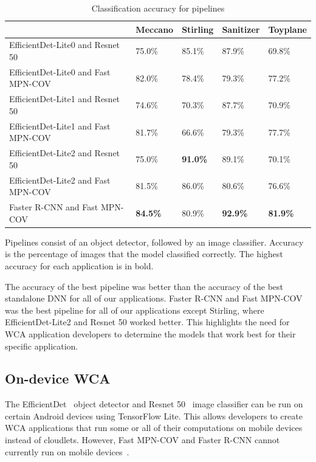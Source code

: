 \begin{table}
\begin{tabular}{|l||l|l|l|l|}
  \hline
  & Meccano & Stirling & Sanitizer & Toyplane\\
  \hline
  \hline
  EfficientDet-Lite0 and Resnet 50 & 75.0\% & 85.1\% & 87.9\% & 69.8\%\\
  EfficientDet-Lite0 and Fast MPN-COV & 82.0\% & 78.4\% & 79.3\% & 77.2\%\\
  EfficientDet-Lite1 and Resnet 50 & 74.6\% & 70.3\% & 87.7\% & 70.9\%\\
  EfficientDet-Lite1 and Fast MPN-COV & 81.7\% & 66.6\% & 79.3\% & 77.7\%\\
  EfficientDet-Lite2 and Resnet 50 & 75.0\% & \textbf{91.0\%} & 89.1\% & 70.1\%\\
  EfficientDet-Lite2 and Fast MPN-COV & 81.5\% & 86.0\% & 80.6\% & 76.6\%\\
  Faster R-CNN and Fast MPN-COV & \textbf{84.5\%} & 80.9\% & \textbf{92.9\%} & \textbf{81.9\%}\\
  \hline
\end{tabular}
  \begin{captiontext}
    Pipelines consist of an object detector, followed by an image classifier.
    Accuracy is the percentage of images that the model classified correctly.
    The highest accuracy for each application is in bold.
  \end{captiontext}
  \caption{
    Classification accuracy for pipelines
  }\label{tab:pipeline_accuracy}
\end{table}

The accuracy of the best pipeline was better than the accuracy of the best
standalone DNN for all of our applications.
Faster R-CNN and Fast MPN-COV was the best pipeline for all of our applications
except Stirling, where EfficientDet-Lite2 and Resnet 50 worked better.
This highlights the need for WCA application developers to determine the models
that work best for their specific application.

\subsection{On-device WCA}

The EfficientDet~\cite{Tan2020} object detector and Resnet 50~\cite{He2016}
image classifier can be run on certain Android devices using TensorFlow Lite.
This allows developers to create WCA applications that run some or all of their
computations on mobile devices instead of cloudlets.
However, Fast MPN-COV and Faster R-CNN cannot currently run on mobile
devices~\cite{tflite, torchscript}.

